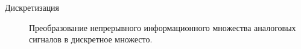 \Defines %
\begin{description}
\item[Дискретизация] Преобразование непрерывного информационного множества аналоговых сигналов в дискретное множесто.
\end{description}


